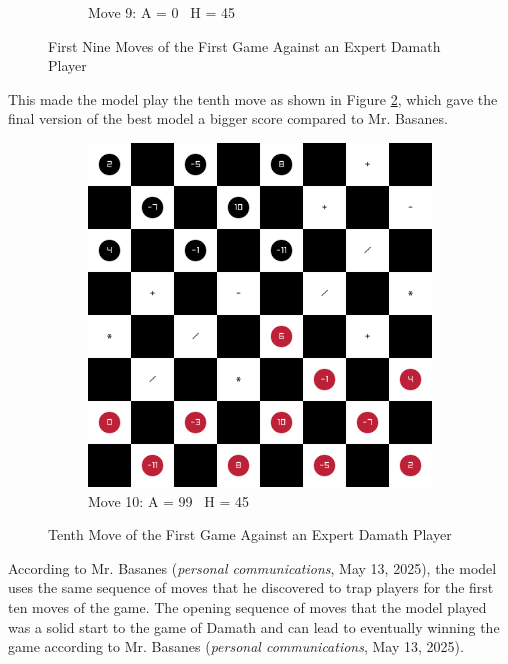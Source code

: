 \begin{figure}[H]
\begin{subfigure}{0.3\textwidth}
        \caption*{Move 9: A = 0 \textbar\ H = 45}
    \end{subfigure}
    \caption{First Nine Moves of the First Game Against an Expert Damath Player} %
    \label{fig:1-9-game1}
\end{figure}

This made the model play the tenth move as shown in Figure \ref{fig:10-game1}, which gave the final version of the best model a bigger score compared to Mr. Basanes.

\begin{figure}[H]
    \centering
    \begin{subfigure}{0.3\textwidth}
        \centering
        \includegraphics[width=\textwidth]{images/games/game1/move_11.png}
        \caption*{Move 10: A = 99 \textbar\ H = 45}
    \end{subfigure}
    \caption{Tenth Move of the First Game Against an Expert Damath Player}
    \label{fig:10-game1}
\end{figure}

According to Mr. Basanes (\textit{personal communications}, May 13, 2025), the model uses the same sequence of moves that he discovered to trap players for the first ten moves of the game. The opening sequence of moves that the model played was a solid start to the game of Damath and can lead to eventually winning the game according to Mr. Basanes (\textit{personal communications}, May 13, 2025).

